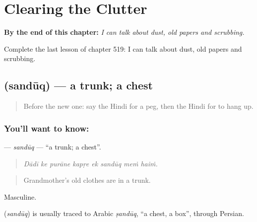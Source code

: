 
\chapter{Clearing the Clutter}
\label{ch:hi-clearing-the-clutter}

\begin{chapteropening}
\textbf{By the end of this chapter:} \emph{I can talk about dust, old papers and scrubbing.}

Complete the last lesson of chapter 519: I can talk about dust, old papers and scrubbing.
\end{chapteropening}

\section[\texorpdfstring{\hi{संदूक़} (sandūq)}{संदूक़ (sandūq)}]{ (sandūq) — a trunk; a chest}

\label{lesson:HI-C519-sanduq}



\begin{quote}
Before the new one: say the Hindi for a peg, then the Hindi for to hang up.
\end{quote}

\subsection*{You'll want to know: }
\textbf{} — \emph{sandūq} — \textquotedblleft{}a trunk; a chest\textquotedblright{}.

\begin{quote}
       
\end{quote}

\begin{quote}
\emph{Dādī ke purāne kapṛe ek sandūq meṁ haiṁ.}
\end{quote}

\begin{quote}
Grandmother's old clothes are in a trunk.
\end{quote}

Masculine.

\begin{cousinweb}
\textbf{} (\emph{sandūq}) is usually traced to Arabic \emph{ṣandūq}, \textquotedblleft{}a chest, a box\textquotedblright{}, through Persian.
\end{cousinweb}

